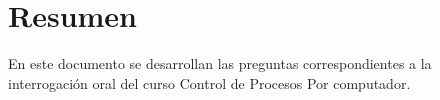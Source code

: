 \section{Resumen}
En este documento se desarrollan las preguntas correspondientes a la interrogación oral del curso Control de Procesos Por computador.
